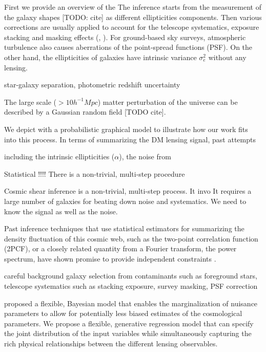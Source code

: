 First we provide an overview of the   
The inference starts from the measurement of the galaxy shapes [TODO: cite] as different
ellipticities components. Then various corrections are usually applied to 
account for the telescope systematics, exposure stacking and masking effects 
(\citealt{Rowe2010}, \citealt{Jee2013a}). For ground-based sky surveys,   
atmospheric turbulence also causes aberrations of the point-spread functions
(PSF). On the other hand, the ellipticities of galaxies have intrinsic
variance $\sigma_e^2$ without any lensing.    


star-galaxy separation, photometric redshift uncertainty  

The large scale ($> 10 h^{-1} Mpc$) matter perturbation of the universe can be  
described by a Gaussian random field [TODO cite].  






We depict with a probabilistic graphical model to illustrate how our work
fits into this process.
In terms of summarizing the DM lensing signal, past attempts   

 
including the intrinsic ellipticities ($\alpha$),
the noise from 

Statistical !!!!
There is a non-trivial, multi-step procedure 

Cosmic shear inference is a non-trivial, multi-step process. It invo 
It requires a large number of galaxies for beating down noise and systematics. 
We need to know the signal as well as the noise. 



Past inference techniques that use statistical estimators for summarizing the 
density fluctuation of this cosmic web, such as  
the two-point correlation function (2PCF), or a closely related quantity from a
Fourier transform, the power spectrum, have shown promise to provide 
independent constraints \citep{Jee2013a}.  

careful background galaxy selection from contaminants
such as foreground stars, telescope systematics such as stacking exposure, 
survey masking, PSF correction 


\cite{Schneider2014} proposed a flexible, Bayesian model that enables the
marginalization of nuisance parameters to allow for potentially less biased 
estimates of the cosmological parameters. 
We propose a flexible, generative regression model    
that can specify the joint distribution of the input variables while 
simultaneously capturing the rich physical relationships between the different
lensing observables.  



